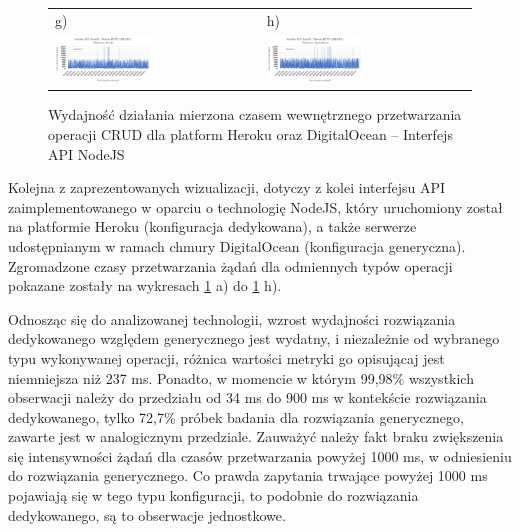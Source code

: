 \begin{figure}[H]
\begin{tabular}{@{}ll@{}}
    g) & h) \\
    \includegraphics[width=0.49\textwidth]{rys05/nodejs-delete-heroku.pdf} & \includegraphics[width=0.49\textwidth]{rys05/nodejs-delete-digitalocean.pdf} \\
	\end{tabular}
  \caption{Wydajność działania mierzona czasem wewnętrznego przetwarzania operacji CRUD dla platform Heroku oraz DigitalOcean -- Interfejs API NodeJS}
  \label{fig:nodejs-heroku-vs-digitalocean}
\end{figure}

Kolejna z zaprezentowanych wizualizacji, dotyczy z kolei interfejsu API zaimplementowanego w oparciu o technologię NodeJS, który uruchomiony został na platformie Heroku (konfiguracja dedykowana), a także serwerze udostępnianym w ramach chmury DigitalOcean (konfiguracja generyczna). Zgromadzone czasy przetwarzania żądań dla odmiennych typów operacji pokazane zostały na wykresach \ref{fig:nodejs-heroku-vs-digitalocean} a) do \ref{fig:nodejs-heroku-vs-digitalocean} h).

Odnosząc się do analizowanej technologii, wzrost wydajności rozwiązania dedykowanego względem generycznego jest wydatny, i niezależnie od wybranego typu wykonywanej operacji, różnica wartości metryki go opisującaj jest niemniejsza niż 237 ms. Ponadto, w momencie w którym 99,98\% wszystkich obserwacji należy do przedziału od 34 ms do 900 ms w kontekście rozwiązania dedykowanego, tylko 72,7\% próbek badania dla rozwiązania generycznego, zawarte jest w analogicznym przedziale. Zauważyć należy fakt braku zwiększenia się intensywności żądań dla czasów przetwarzania powyżej 1000 ms, w odniesieniu do rozwiązania generycznego. Co prawda zapytania trwające powyżej 1000 ms pojawiają się w tego typu konfiguracji, to podobnie do rozwiązania dedykowanego, są to obserwacje jednostkowe.  

